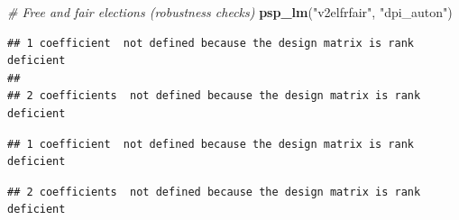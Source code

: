 \documentclass[
]{article}
\newenvironment{Shaded}{\begin{snugshade}}{\end{snugshade}}
\newcommand{\CommentTok}[1]{\textcolor[rgb]{0.56,0.35,0.01}{\textit{#1}}}
\newcommand{\KeywordTok}[1]{\textcolor[rgb]{0.13,0.29,0.53}{\textbf{#1}}}
\newcommand{\NormalTok}[1]{#1}
\newcommand{\StringTok}[1]{\textcolor[rgb]{0.31,0.60,0.02}{#1}}
\begin{document}
\begin{Shaded}
\begin{Highlighting}[]
\CommentTok{# Free and fair elections (robustness checks)}
\KeywordTok{psp_lm}\NormalTok{(}\StringTok{"v2elfrfair"}\NormalTok{, }\StringTok{"dpi_auton"}\NormalTok{)}
\end{Highlighting}
\end{Shaded}

\begin{verbatim}
## 1 coefficient  not defined because the design matrix is rank deficient
## 
## 2 coefficients  not defined because the design matrix is rank deficient
\end{verbatim}

\begin{verbatim}
## 1 coefficient  not defined because the design matrix is rank deficient
\end{verbatim}

\begin{verbatim}
## 2 coefficients  not defined because the design matrix is rank deficient
\end{verbatim}
\end{document}
